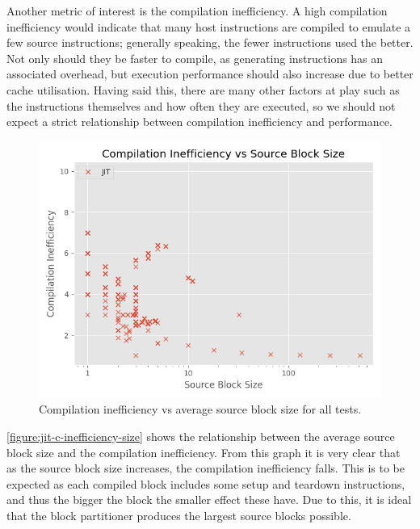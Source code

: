 Another metric of interest is the compilation inefficiency. A high compilation inefficiency would indicate that many host instructions are compiled to emulate a few source instructions; generally speaking, the fewer instructions used the better. Not only should they be faster to compile, as generating instructions has an associated overhead, but execution performance should also increase due to better cache utilisation. Having said this, there are many other factors at play such as the instructions themselves and how often they are executed, so we should not expect a strict relationship between compilation inefficiency and performance.

\begin{figure}[H]
    \centering
    \includegraphics[scale=0.75]{output/graphs/scatter/single/jit/c-efficiency-vs-hotness.png}
    \caption{Compilation inefficiency vs average source block size for all tests.}
    \label{figure:jit-c-inefficiency-size}
\end{figure}

\autoref{figure:jit-c-inefficiency-size} shows the relationship between the average source block size and the compilation inefficiency. From this graph it is very clear that as the source block size increases, the compilation inefficiency falls. This is to be expected as each compiled block includes some setup and teardown instructions, and thus the bigger the block the smaller effect these have. Due to this, it is ideal that the block partitioner produces the largest source blocks possible.

